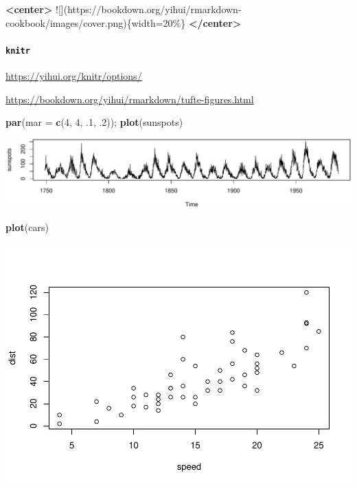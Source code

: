 \documentclass[
]{book}
\newenvironment{Shaded}{\begin{snugshade}}{\end{snugshade}}
\newcommand{\AlertTok}[1]{\textcolor[rgb]{0.94,0.16,0.16}{#1}}
\newcommand{\AttributeTok}[1]{\textcolor[rgb]{0.13,0.29,0.53}{#1}}
\newcommand{\DecValTok}[1]{\textcolor[rgb]{0.00,0.00,0.81}{#1}}
\newcommand{\FunctionTok}[1]{\textcolor[rgb]{0.13,0.29,0.53}{\textbf{#1}}}
\newcommand{\KeywordTok}[1]{\textcolor[rgb]{0.13,0.29,0.53}{\textbf{#1}}}
\newcommand{\NormalTok}[1]{#1}
\theoremstyle{definition}
\theoremstyle{definition}
\theoremstyle{definition}
\theoremstyle{definition}
\theoremstyle{remark}
\begin{document}
\begin{Shaded}
\begin{Highlighting}[]
\KeywordTok{\textless{}center\textgreater{}}
\AlertTok{![](https://bookdown.org/yihui/rmarkdown{-}cookbook/images/cover.png)}\NormalTok{\{width=20\%\}}
\KeywordTok{\textless{}/center\textgreater{}}
\end{Highlighting}
\end{Shaded}

\hypertarget{knitr}{%
\paragraph{\texorpdfstring{\texttt{knitr}}{knitr}}\label{knitr}}

\url{https://yihui.org/knitr/options/}

\url{https://bookdown.org/yihui/rmarkdown/tufte-figures.html}

\begin{Shaded}
\begin{Highlighting}[]
\FunctionTok{par}\NormalTok{(}\AttributeTok{mar =} \FunctionTok{c}\NormalTok{(}\DecValTok{4}\NormalTok{, }\DecValTok{4}\NormalTok{, .}\DecValTok{1}\NormalTok{, .}\DecValTok{2}\NormalTok{)); }\FunctionTok{plot}\NormalTok{(sunspots)}
\end{Highlighting}
\end{Shaded}

\includegraphics{202401280001-test_files/figure-latex/unnamed-chunk-11-1.pdf}

\begin{Shaded}
\begin{Highlighting}[]
\FunctionTok{plot}\NormalTok{(cars)}
\end{Highlighting}
\end{Shaded}

\includegraphics{202401280001-test_files/figure-latex/fig-margin-1.pdf}
\end{document}

